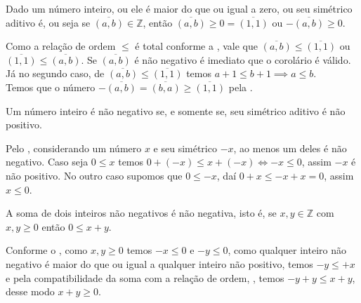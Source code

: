 \documentclass[../main.tex]{subfiles}
\begin{document}
\begin{corol}\label{int-corol-numeroOuSimetricoPositivo}
    Dado um número inteiro, ou ele é maior do que ou igual a zero, ou seu simétrico aditivo é, ou seja
    se $\overline{(a,b)} \in \mathbb{Z}$, então $\overline{(a,b)} \geq 0 = \overline{(1,1)}$ ou $-\overline{(a,b)} \geq 0$.
\end{corol}
\begin{dem}
    Como a relação de ordem $\leq$ é total conforme a , vale que $\overline{(a,b)} \leq \overline{(1,1)}$ ou $\overline{(1,1)} \leq \overline{(a,b)}$. Se $\overline{(a,b)}$ é não negativo é imediato que o corolário é válido. Já no segundo caso, 
    de $\overline{(a,b)} \leq \overline{(1,1)}$ temos $a+1 \leq b+1 \implies a \leq b$. \\
    Temos que o número $-\overline{(a,b)} = \overline{(b,a)} \geq \overline{(1,1)}$ pela .
\end{dem}

\begin{corol}\label{int-corol-simetricoSinalTrocado}
    Um número inteiro é não negativo se, e somente se, seu simétrico aditivo é não positivo.
\end{corol}
\begin{dem}
    Pelo , considerando um número $x$ e seu simétrico $-x$, ao menos um deles é não negativo. Caso seja $0 \leq x$ temos $0 + (-x) \leq x + (-x) \iff -x \leq 0$, assim $-x$ é não positivo. No outro caso supomos que $0 \leq -x$, daí 
    $0 + x \leq -x + x = 0$, assim $x \leq 0$.
\end{dem}

\begin{prop}\label{int-prop-somaPositivosPositiva}
    A soma de dois inteiros não negativos é não negativa, isto é, se $x, y \in \mathbb{Z}$ com $x,y \geq 0$ então $0 \leq x+y$.
\end{prop}
\begin{dem}
    Conforme o , como $x,y \geq 0$ temos $-x \leq 0$ e $-y \leq 0$, como qualquer inteiro não negativo é maior do que ou igual a qualquer inteiro não positivo, temos $-y \leq +x$ e pela compatibilidade da soma com a relação de ordem, , temos 
    $-y + y \leq x + y$, desse modo $x+y \geq 0$.
\end{dem}
\end{document}
